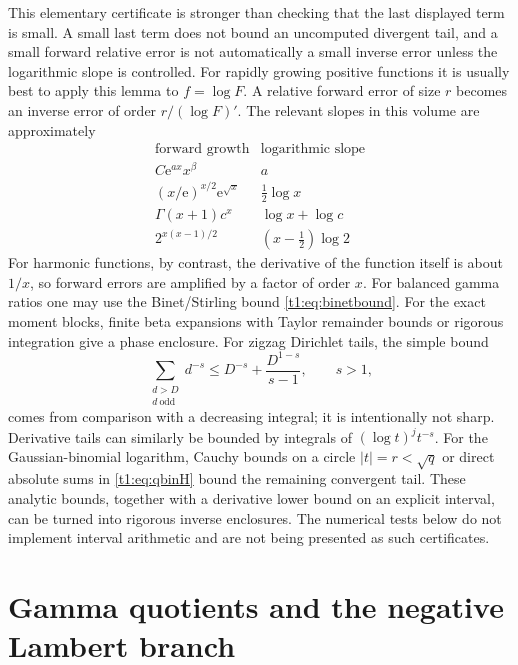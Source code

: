 \documentclass[11pt,openany]{book}
\numberwithin{equation}{chapter}
\theoremstyle{plain}
\theoremstyle{definition}
\theoremstyle{remark}
\newcommand{\ee}{\mathrm e}
\begin{document}
This elementary certificate is stronger than checking that the last displayed term is small. A small last term does not bound an uncomputed divergent tail, and a small forward relative error is not automatically a small inverse error unless the logarithmic slope is controlled.
For rapidly growing positive functions it is usually best to apply this lemma to $f=\log F$. A relative forward error of size $r$ becomes an inverse error of order $r/(\log F)'$. The relevant slopes in this volume are approximately
\[
 \begin{array}{c|c}
 \text{forward growth}&\text{logarithmic slope}\\\hline
 C\ee^{ax}x^\beta&a\\
 (x/\ee)^{x/2}\ee^{\sqrt x}&\tfrac12\log x\\
 \Gamma(x+1)c^x&\log x+\log c\\
 2^{x(x-1)/2}&(x-\tfrac12)\log2
 \end{array}
\]
For harmonic functions, by contrast, the derivative of the function itself is about $1/x$, so forward errors are amplified by a factor of order $x$.
For balanced gamma ratios one may use the Binet/Stirling bound \eqref{t1:eq:binetbound}. For the exact moment blocks, finite beta expansions with Taylor remainder bounds or rigorous integration give a phase enclosure. For zigzag Dirichlet tails, the simple bound
\begin{equation}
 \sum_{\substack{d>D\\d\ \mathrm{odd}}}d^{-s}
 \le D^{-s}+\frac{D^{1-s}}{s-1},\qquad s>1,
 \label{t1:eq:dirichlettail}
\end{equation}
comes from comparison with a decreasing integral; it is intentionally not sharp. Derivative tails can similarly be bounded by integrals of $(\log t)^j t^{-s}$. For the Gaussian-binomial logarithm, Cauchy bounds on a circle $|t|=r<\sqrt q$ or direct absolute sums in \eqref{t1:eq:qbinH} bound the remaining convergent tail. These analytic bounds, together with a derivative lower bound on an explicit interval, can be turned into rigorous inverse enclosures. The numerical tests below do not implement interval arithmetic and are not being presented as such certificates.

\part{Gamma quotients and the negative Lambert branch}
\label{ct:part:gamma}
\end{document}
